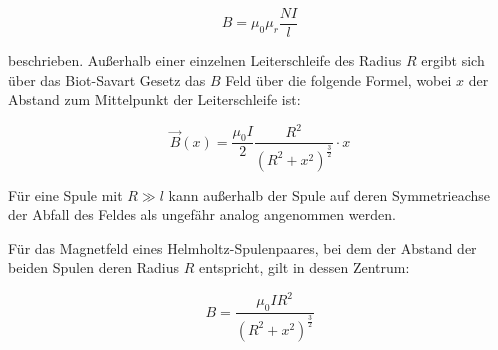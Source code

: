 \begin{equation}
    B = \mu_0 \mu_r \frac{NI}l 
\end{equation}

beschrieben. Außerhalb einer einzelnen Leiterschleife des Radius $R$ ergibt sich über das 
Biot-Savart Gesetz das $B$ Feld über die folgende Formel, wobei $x$ der Abstand zum Mittelpunkt
der Leiterschleife ist:

\begin{equation}
    \vec B(x)= \frac{\mu_0 I}{2} \frac{R^2}{(R^2 + x^2)^\frac{3}2}\cdot x
\end{equation}

Für eine Spule mit $R \gg l$ kann außerhalb der Spule auf deren Symmetrieachse der Abfall des Feldes 
als ungefähr analog angenommen werden.

Für das Magnetfeld eines Helmholtz-Spulenpaares, bei dem der Abstand der beiden 
Spulen deren Radius $R$ entspricht, gilt in dessen Zentrum:

\begin{equation}
    B = \frac{\mu_0 I R^2}{({R^2}+{x^2})^\frac{3}2}
\end{equation}


